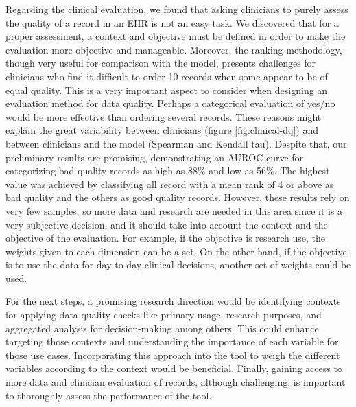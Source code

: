 Regarding the clinical evaluation, we found that asking clinicians to purely assess the quality of a record in an EHR is not an easy task. We discovered that for a proper assessment, a context and objective must be defined in order to make the evaluation more objective and manageable. Moreover, the ranking methodology, though very useful for comparison with the model, presents challenges for clinicians who find it difficult to order 10 records when some appear to be of equal quality. This is a very important aspect to consider when designing an evaluation method for data quality. Perhaps a categorical evaluation of yes/no would be more effective than ordering several records. These reasons might explain the great variability between clinicians (figure \ref{fig:clinical-dq}) and between clinicians and the model (Spearman and Kendall tau). Despite that, our preliminary results are promising, demonstrating an AUROC curve for categorizing bad quality records as high as 88\% and low as 56\%. The highest value was achieved by classifying all record with a mean rank of 4 or above as bad quality and the others as good quality records. However, these results rely on very few samples, so more data and research are needed in this area since it is a very subjective decision, and it should take into account the context and the objective of the evaluation. For example, if the objective is research use, the weights given to each dimension can be a set. On the other hand, if the objective is to use the data for day-to-day clinical decisions, another set of weights could be used. 

For the next steps, a promising research direction would be identifying contexts for applying data quality checks like primary usage, research purposes, and aggregated analysis for decision-making among others. This could enhance targeting those contexts and understanding the importance of each variable for those use cases. Incorporating this approach into the tool to weigh the different variables according to the context would be beneficial.  Finally, gaining access to more data and clinician evaluation of records, although challenging, is important to thoroughly assess the performance of the tool.

